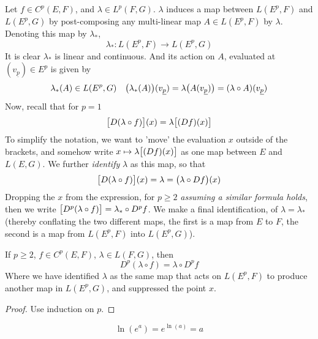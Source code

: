 \documentclass[../main-manifolds.tex]{subfiles}
\begin{document}
\begin{note}
    Let $f\in C^p(E,F)$, and $\lambda\in L^p(F,G)$. $\lambda$ induces a map between $L(E^p, F)$ and $L(E^p, G)$ by post-composing any multi-linear map $A\in L(E^p, F)$ by $\lambda$. Denoting this map by $\lambda_*$, 
\[
\lambda_*: L(E^p, F)\to L(E^p, G)
\]
It is clear $\lambda_*$ is linear and continuous. And its action on $A$, evaluated at $(v_{\underline{p}})\in E^p$ is given by
\[
    \lambda_*(A)\in L(E^p, G)\quad \qty\big(\lambda_*(A))(v_{\underline{p}}) = \lambda\qty\big(A(v_{\underline{p}})) = (\lambda\circ A)(v_{\underline{p}})
\]
Now, recall that for $p=1$
\[
    \qty\big[D(\lambda\circ f)](x) = \lambda\qty\big[(Df)(x)]
\]
To simplify the notation, we want to 'move' the evaluation $x$ outside of the brackets, and somehow write $x\mapsto \lambda\qty\big[(Df)(x)]$ as one map between $E$ and $L(E,G)$. We further \emph{identify} $\lambda$ as this map, so that
\[
    \qty\big[D(\lambda\circ f)](x) = \lambda  = \qty\big(\lambda \circ Df)(x)
\]
Dropping the $x$ from the expression, for $p\geq 2$ \emph{assuming a similar formula holds}, then we write $\qty\big[D^p(\lambda\circ f)] = \lambda_*\circ D^pf$. We make a final identification, of $\lambda = \lambda_*$ (thereby conflating the two different maps, the first is a map from $E$ to $F$, the second is a map from $L(E^p, F)$ into $L(E^p, G)$).
\end{note}

\begin{wts}
    If $p\geq 2$, $f\in C^p(E,F)$, $\lambda\in L(F,G)$, then
    \[
        D^p(\lambda\circ f) = \lambda\circ D^pf
    \]
    Where we have identified $\lambda$ as the same map that acts on $L(E^p, F)$ to produce another map in $L(E^p, G)$, and suppressed the point $x$.
\end{wts}
\begin{proof}
    Use induction on $p$.
\end{proof}


\newpage

\[
    \ln(e^{a}) = e^{\ln(a)} = a
\]
\end{document}
